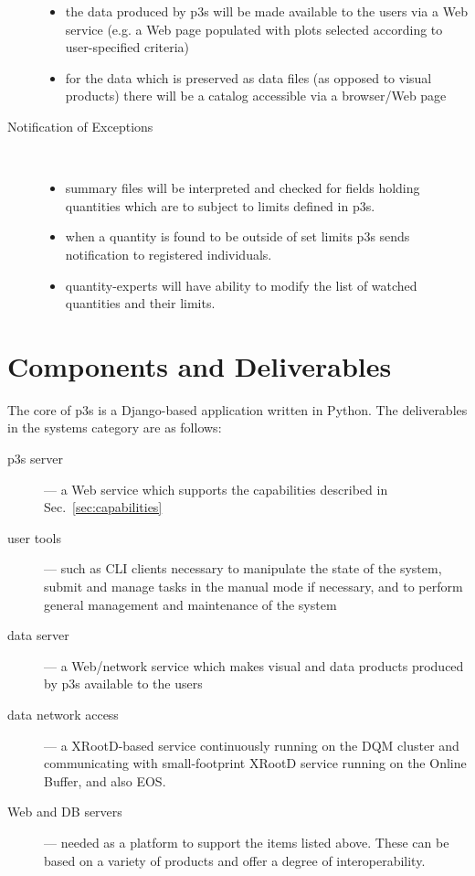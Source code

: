 \documentclass[pdftex,12pt,letter]{article}
\begin{document}
\begin{description}
\begin{itemize}
\item the data produced by p3s will be made available to the users via a Web service
(e.g. a Web page populated with plots selected according to user-specified criteria)

\item for the data which is preserved as data files (as opposed to visual products)
there will be a catalog accessible via a browser/Web page

\end{itemize} 

\item[Notification of Exceptions]\ 
\begin{itemize}

\item summary files will be interpreted and checked for fields holding quantities which are to subject to limits defined in p3s.

\item when a quantity is found to be outside of set limits p3s sends notification to registered individuals. 

\item quantity-experts will have ability to modify the list of watched quantities and their limits.

\end{itemize} 

\end{description}

\section{Components and Deliverables}

The core of p3s is a Django-based \cite{django} application written in Python. The
deliverables in the systems category are as follows:

\begin{description}
\item[p3s server] --- a Web service which supports the capabilities described in Sec.~\ref{sec:capabilities}

\item[user tools] --- such as CLI clients necessary to manipulate the state of the system, submit
and manage tasks in the manual mode if necessary, and to perform general management and
maintenance of the system

\item[data server] --- a Web/network service which makes visual and data products produced by p3s
available to the users

\item[data network access] --- a XRootD-based service continuously running on the DQM cluster
and communicating with small-footprint XRootD service running on the Online Buffer, and also EOS.

\item[Web and DB servers] --- needed as a platform to support the items listed above. These
can be based on a variety of products and offer a degree of interoperability.

\end{description}
\end{document}
